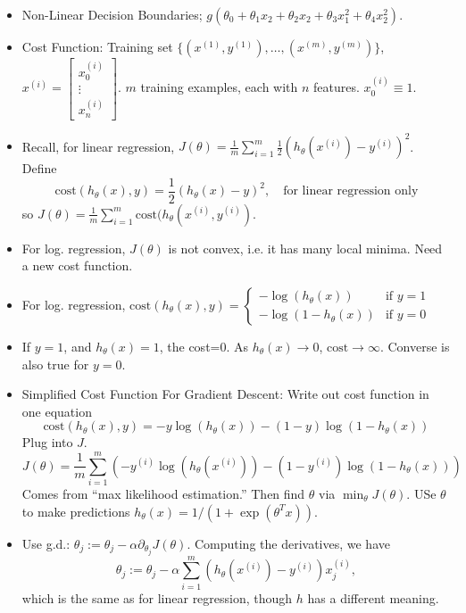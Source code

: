 \documentclass[10pt]{article}
\begin{document}
\begin{itemize}
  \item Non-Linear Decision Boundaries; $g(\theta_0 + \theta_1x_2 + \theta_2x_2 + \theta_3x_1^2 + \theta_4x_2^2)$.
  \item Cost Function: Training set $\{ (x^{(1)}, y^{(1)}), \dots, (x^{(m)},y^{(m)})\}$, $x^{(i)} = \begin{bmatrix}x_0^{(i)} \\ \vdots \\ x^{(i)}_n\end{bmatrix}$. $m$ training examples, each with $n$ features. $x_0^{(i)} \equiv 1$.
  \item Recall, for linear regression, $J(\theta) = \frac{1}{m} \sum_{i=1}^m \frac{1}{2} \left( h_{\theta}(x^{(i)}) - y^{(i)} \right)^2$. Define
    \begin{equation*}
      \text{cost}(h_{\theta}(x),y) = \frac{1}{2} \left( h_{\theta}(x) - y\right)^2, \quad \text{for linear regression only}
    \end{equation*}
    so $J(\theta) = \frac{1}{m}\sum_{i=1}^m \text{cost}(h_{\theta}(x^{(i)}, y^{(i)})$.
  \item For log. regression, $J(\theta)$ is not convex, i.e. it has many local minima. Need a new cost function.
  \item For log. regression, $\text{cost}(h_{\theta}(x),y) = \begin{cases} -\log(h_{\theta}(x)) & \mbox{if } y=1 \\ -\log(1-h_{\theta}(x)) & \mbox{if } y=0 \end{cases}$
  \item If $y=1$, and $h_{\theta}(x)=1$, the cost=0. As $h_{\theta}(x)
    \rightarrow 0$, $\text{cost} \rightarrow \infty$. Converse is also
    true for $y=0$.
  \item Simplified Cost Function For Gradient Descent: Write out cost function in one equation
    \begin{equation*}
      \text{cost}(h_{\theta}(x),y) = -y \log(h_{\theta}(x)) - (1-y) \log (1 - h_{\theta}(x))
    \end{equation*}
    Plug into $J$.
    \begin{equation*}
      J(\theta) = \frac{1}{m} \sum_{i=1}^m \left( -y^{(i)} \log\left(h_{\theta}(x^{(i)})\right) - (1-y^{(i)}) \log \left(1- h_{\theta}(x) \right) \right)
    \end{equation*}
    Comes from ``max likelihood estimation.'' Then find $\theta$ via $\min_{\theta}J(\theta)$. USe $\theta$ to make predictions $h_{\theta}(x) = 1/(1 + \exp(\theta^Tx))$.
  \item Use g.d.: $\theta_j := \theta_j - \alpha \partial_{\theta_j} J(\theta)$. Computing the derivatives, we have
    \begin{equation*}
      \theta_j := \theta_j - \alpha \sum_{i=1}^m \left( h_{\theta}(x^{(i)}) - y^{(i)}\right)x_j^{(i)},
    \end{equation*}
    which is the same as for linear regression, though $h$ has a different meaning.
\end{itemize}
\end{document}
